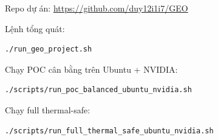 \documentclass[../DoAn.tex]{subfiles}
\begin{document}
Repo dự án: \url{https://github.com/duy12i1i7/GEO}

Lệnh tổng quát:
\begin{verbatim}
./run_geo_project.sh
\end{verbatim}

Chạy POC cân bằng trên Ubuntu + NVIDIA:
\begin{verbatim}
./scripts/run_poc_balanced_ubuntu_nvidia.sh
\end{verbatim}

Chạy full thermal-safe:
\begin{verbatim}
./scripts/run_full_thermal_safe_ubuntu_nvidia.sh
\end{verbatim}
\end{document}
